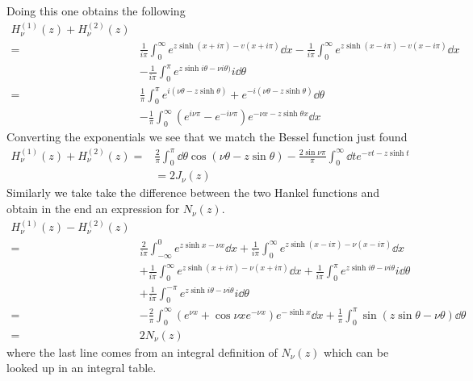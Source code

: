 \documentclass[a4paper,12pt]{article}
\begin{document}
Doing this one obtains the following
\begin{equation}
	\begin{aligned}
		H_\nu^{(1)}(z)+H_\nu^{(2)}(z)\\
		=&\frac{1}{i\pi}\int_{0}^{\infty}e^{z\sinh (x+i\pi)-v(x+i\pi)}\dd 
	x-\frac{1}{i\pi}\int_{0}^{\infty}e^{z\sinh (x-i\pi)-v(x-i\pi)}\dd x\\
&-\frac{1}{i\pi}\int_{0}^{\pi}e^{z\sinh i\theta -\nu i\theta)}i\dd \theta\\
	 =&\frac{1}{\pi}\int_0^\pi e^{i(\nu\theta-z\sinh\theta)}+e^{-i(\nu\theta-z\sinh\theta)}\dd \theta\\
	 &-\frac{1}{\pi}\int_0^\infty \left(e^{i\nu\pi}-e^{-i\nu\pi}\right)e^{-\nu x-z\sinh\theta x}\dd  x
	\end{aligned}
\end{equation}
Converting the exponentials we see that we match the Bessel function just found
\begin{equation}
	\begin{aligned}
		H_\nu^{(1)}(z)+H_\nu^{(2)}(z)=&\frac{2}{\pi} \int_0^\pi \dd \theta\cos(\nu\theta -z\sin\theta)
		-\frac{2\sin\nu\pi}{\pi} \int_0^\infty\dd t e^{-vt-z\sinh t}\\
		&=
		2J_\nu(z)
	\end{aligned}
\end{equation}
Similarly we take take the difference between the two Hankel functions and obtain in the end an expression for $N_\nu(z)$.
\begin{equation}
	\begin{aligned}
		H_\nu^{(1)}(z)-H_\nu^{(2)}(z)\\
		=&\frac{2}{i\pi}\int_{-\infty}^{0}e^{z\sinh x-\nu x}\dd 
		x+\frac{1}{i\pi}\int_{0}^{\infty}e^{z\sinh (x-i\pi)-\nu(x-i\pi)}\dd x\\
		&+\frac{1}{i\pi}\int_{0}^{\infty}e^{z\sinh (x+i\pi)-\nu(x+i\pi)}\dd x+\frac{1}{i\pi}\int_{0}^{\pi}e^{z\sinh i\theta -\nu i\theta}i\dd \theta\\
		&+\frac{1}{i\pi}\int_{0}^{-\pi}e^{z\sinh i\theta -\nu i\theta}i\dd \theta
		\\ 
		=&-\frac{2}{\pi}\int_{0}^{\infty}\left(e^{\nu x}+\cos{\nu x}e^{-\nu x}\right)e^{-\sinh x}\dd x+\frac{1}{\pi}\int_{0}^{\pi}\sin(z\sin\theta-\nu\theta)\dd \theta
		\\
		=& 2N_\nu(z)
	\end{aligned}
\end{equation}
where the last line comes from an integral definition of $N_\nu(z)$ which can be looked up in an integral table. 
\end{document}
